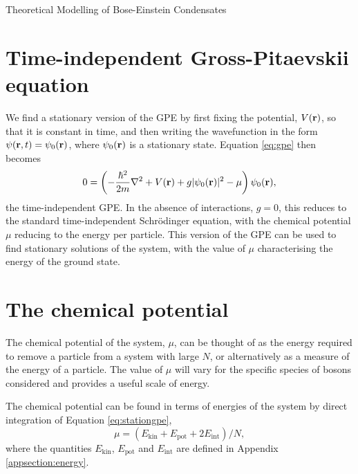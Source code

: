 \begin{chapter}{\label{cha:theoretical_model}Theoretical Modelling of Bose-Einstein Condensates}
\section{\label{section:gpestationary} Time-independent Gross-Pitaevskii equation}
 We find a stationary version of the GPE by first fixing the potential, $V({\bf r})$, so that it is constant in time, and then writing the wavefunction in the form $\psi({\bf r},t) = \psi_0({\bf r})$, where $\psi_0({\bf r})$ is a stationary state. Equation \ref{eq:gpe} then becomes
	\begin{equation}\label{eq:stationgpe}
		0 = \left( -\frac{\hbar^2}{2m}\nabla^2 + V({\bf r}) + g|\psi_0({\bf r})|^2 - \mu\right) \psi_0({\bf r}),
	\end{equation}
	the time-independent GPE. In the absence of interactions, $g=0$, this reduces to the standard time-independent Schr\"odinger equation, with the chemical potential $\mu$ reducing to the energy per particle. This version of the GPE can be used to find stationary solutions of the system, with the value of $\mu$ characterising the energy of the ground state.

\section{\label{section:mu} The chemical potential}
 The chemical potential of the system, $\mu$, can be thought of as the energy required to remove a particle from a system with large $N$, or alternatively as a measure of the energy of a particle. The value of $\mu$ will vary for the specific species of bosons considered and provides a useful scale of energy.
 
 The chemical potential can be found in terms of energies of the system by direct integration of Equation \ref{eq:stationgpe},
 	\begin{equation}\label{eq:chempot}
 		\mu = \left ( E_{\mathrm{kin}} + E_{\mathrm{pot}} + 2E_{\mathrm{int}} \right ) / N,
 	\end{equation}
 	where the quantities $E_{\mathrm{kin}}$, $E_{\mathrm{pot}}$ and $E_{\mathrm{int}}$ are defined in Appendix \ref{appsection:energy}.


\end{chapter}
